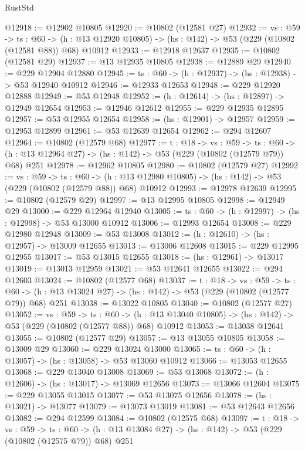 \begin{lexlean}{RustStd}
\begin{coremodule}
@12918 := @12902 @10805
@12920 := @10802 (@12581 @27)
@12932 := {vs : @59} ->
  {ts : @60} ->
  (h : @13 @12920 @10805) -> (hs : @142) -> @53 (@229 (@10802 (@12581 @88)) @68) @10912
@12933 := @12918 @12637
@12935 := @10802 (@12581 @29)
@12937 := @13 @12935 @10805
@12938 := @12889 @29
@12940 := @229 @12904 @12880
@12945 := {ts : @60} -> (h : @12937) -> (hs : @12938) -> @53 @12940 @10912
@12946 := @12933 @12653
@12948 := @229 @12920 @12888
@12949 := @53 @12948
@12952 := (h : @12614) -> (hs : @12897) -> @12949 @12654
@12953 := @12946 @12612
@12955 := @229 @12935 @12895
@12957 := @53 @12955 @12654
@12958 := (hs : @12901) -> @12957
@12959 := @12953 @12899
@12961 := @53 @12639 @12654
@12962 := @294 @12607
@12964 := @10802 (@12579 @68)
@12977 := {t : @18} ->
  {vs : @59} ->
  {ts : @60} -> (h : @13 @12964 @27) -> (hs : @142) -> @53 (@229 (@10802 (@12579 @79)) @68) @251
@12978 := @12962 @10805
@12980 := @10802 (@12579 @27)
@12992 := {vs : @59} ->
  {ts : @60} ->
  (h : @13 @12980 @10805) -> (hs : @142) -> @53 (@229 (@10802 (@12579 @88)) @68) @10912
@12993 := @12978 @12639
@12995 := @10802 (@12579 @29)
@12997 := @13 @12995 @10805
@12998 := @12949 @29
@13000 := @229 @12964 @12940
@13005 := {ts : @60} -> (h : @12997) -> (hs : @12998) -> @53 @13000 @10912
@13006 := @12993 @12654
@13008 := @229 @12980 @12948
@13009 := @53 @13008
@13012 := (h : @12610) -> (hs : @12957) -> @13009 @12655
@13013 := @13006 @12608
@13015 := @229 @12995 @12955
@13017 := @53 @13015 @12655
@13018 := (hs : @12961) -> @13017
@13019 := @13013 @12959
@13021 := @53 @12641 @12655
@13022 := @294 @12603
@13024 := @10802 (@12577 @68)
@13037 := {t : @18} ->
  {vs : @59} ->
  {ts : @60} -> (h : @13 @13024 @27) -> (hs : @142) -> @53 (@229 (@10802 (@12577 @79)) @68) @251
@13038 := @13022 @10805
@13040 := @10802 (@12577 @27)
@13052 := {vs : @59} ->
  {ts : @60} ->
  (h : @13 @13040 @10805) -> (hs : @142) -> @53 (@229 (@10802 (@12577 @88)) @68) @10912
@13053 := @13038 @12641
@13055 := @10802 (@12577 @29)
@13057 := @13 @13055 @10805
@13058 := @13009 @29
@13060 := @229 @13024 @13000
@13065 := {ts : @60} -> (h : @13057) -> (hs : @13058) -> @53 @13060 @10912
@13066 := @13053 @12655
@13068 := @229 @13040 @13008
@13069 := @53 @13068
@13072 := (h : @12606) -> (hs : @13017) -> @13069 @12656
@13073 := @13066 @12604
@13075 := @229 @13055 @13015
@13077 := @53 @13075 @12656
@13078 := (hs : @13021) -> @13077
@13079 := @13073 @13019
@13081 := @53 @12643 @12656
@13082 := @294 @12599
@13084 := @10802 (@12575 @68)
@13097 := {t : @18} ->
  {vs : @59} ->
  {ts : @60} -> (h : @13 @13084 @27) -> (hs : @142) -> @53 (@229 (@10802 (@12575 @79)) @68) @251

\end{coremodule}
\end{lexlean}
